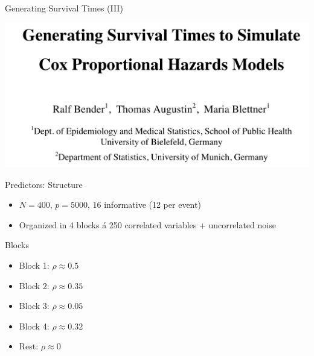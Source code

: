 \documentclass{beamer}
\providecommand{\tightlist}{%
  \setlength{\itemsep}{0pt}\setlength{\parskip}{0pt}}
\begin{document}
\begin{frame}{Generating Survival Times (III)}
\protect\hypertarget{generating-survival-times-iii}{}
\textcite{bender2005generatingsurvival}

\includegraphics[width=0.95\linewidth]{img/bender2003}
\end{frame}

\begin{frame}{Predictors: Structure}
\protect\hypertarget{predictors-structure}{}
\begin{itemize}
\tightlist
\item
  \(N = 400\), \(p = 5000\), 16 informative (12 per event)
\item
  Organized in 4 blocks á 250 correlated variables + uncorrelated noise
\end{itemize}

\begin{block}{Blocks}
\protect\hypertarget{blocks}{}
\begin{itemize}
\tightlist
\item
  Block 1: \(\rho \approx 0.5\)
\item
  Block 2: \(\rho \approx 0.35\)
\item
  Block 3: \(\rho \approx 0.05\)
\item
  Block 4: \(\rho \approx 0.32\)
\item
  Rest: \(\rho \approx 0\)
\end{itemize}
\end{block}
\end{frame}
\end{document}
